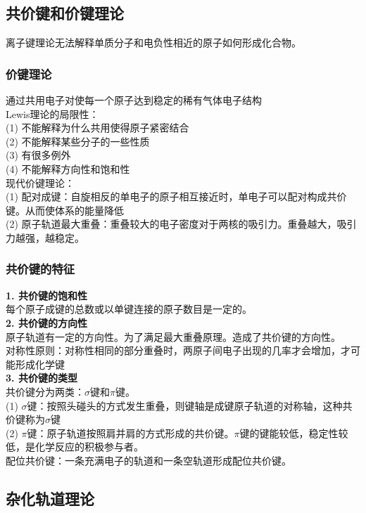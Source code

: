 \documentclass[utf8,a4paper,12pt]{ctexart}
\begin{document}
\subsection{共价键和价键理论}
离子键理论无法解释单质分子和电负性相近的原子如何形成化合物。\\
\subsubsection{价键理论}
通过共用电子对使每一个原子达到稳定的稀有气体电子结构\\
Lewis理论的局限性：\\
(1) 不能解释为什么共用使得原子紧密结合\\
(2) 不能解释某些分子的一些性质\\
(3) 有很多例外\\
(4) 不能解释方向性和饱和性\\
现代价键理论：\\
(1) 配对成键：自旋相反的单电子的原子相互接近时，单电子可以配对构成共价键。从而使体系的能量降低\\
(2) 原子轨道最大重叠：重叠较大的电子密度对于两核的吸引力。重叠越大，吸引力越强，越稳定。\\
\subsubsection{共价键的特征}
{\bf 1. 共价键的饱和性}\\
每个原子成键的总数或以单键连接的原子数目是一定的。\\
{\bf 2. 共价键的方向性}\\
原子轨道有一定的方向性。为了满足最大重叠原理。造成了共价键的方向性。\\
对称性原则：对称性相同的部分重叠时，两原子间电子出现的几率才会增加，才可能形成化学键\\
{\bf 3. 共价键的类型}\\
共价键分为两类：$\sigma$键和$\pi$键。\\
(1) $\sigma$键：按照头碰头的方式发生重叠，则键轴是成键原子轨道的对称轴，这种共价键称为$\sigma$键\\
(2) $\pi$键：原子轨道按照肩并肩的方式形成的共价键。$\pi$键的键能较低，稳定性较低，是化学反应的积极参与者。\\
配位共价键：一条充满电子的轨道和一条空轨道形成配位共价键。

\subsection{杂化轨道理论}
\end{document}

